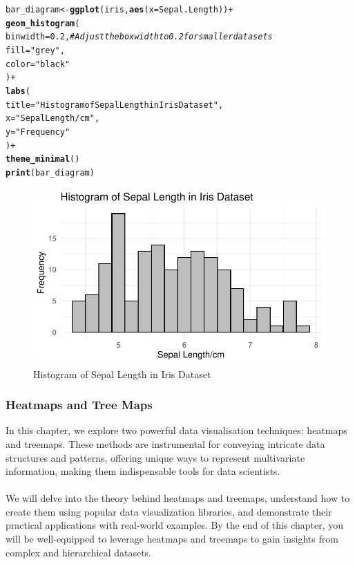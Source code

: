 \documentclass{article}\usepackage[]{graphicx}\usepackage[]{xcolor}
\makeatletter
\def\maxwidth{ %
  \ifdim\Gin@nat@width>\linewidth
    \linewidth
  \else
    \Gin@nat@width
  \fi
}
\newcommand{\hlnum}[1]{\textcolor[rgb]{0.686,0.059,0.569}{#1}}%
\newcommand{\hlstr}[1]{\textcolor[rgb]{0.192,0.494,0.8}{#1}}%
\newcommand{\hlcom}[1]{\textcolor[rgb]{0.678,0.584,0.686}{\textit{#1}}}%
\newcommand{\hlopt}[1]{\textcolor[rgb]{0,0,0}{#1}}%
\newcommand{\hlstd}[1]{\textcolor[rgb]{0.345,0.345,0.345}{#1}}%
\newcommand{\hlkwb}[1]{\textcolor[rgb]{0.69,0.353,0.396}{#1}}%
\newcommand{\hlkwc}[1]{\textcolor[rgb]{0.333,0.667,0.333}{#1}}%
\newcommand{\hlkwd}[1]{\textcolor[rgb]{0.737,0.353,0.396}{\textbf{#1}}}%
\newenvironment{kframe}{%
 \def\at@end@of@kframe{}%
 \ifinner\ifhmode%
  \def\at@end@of@kframe{\end{minipage}}%
  \begin{minipage}{\columnwidth}%
 \fi\fi%
 \def\FrameCommand##1{\hskip\@totalleftmargin \hskip-\fboxsep
 \colorbox{shadecolor}{##1}\hskip-\fboxsep
     \hskip-\linewidth \hskip-\@totalleftmargin \hskip\columnwidth}%
 \MakeFramed {\advance\hsize-\width
   \@totalleftmargin\z@ \linewidth\hsize
   \@setminipage}}%
 {\par\unskip\endMakeFramed%
 \at@end@of@kframe}
\newenvironment{knitrout}{}{} %
\makeatother
\begin{document}
\begin{knitrout}
\color{fgcolor}\begin{kframe}
\begin{alltt}
\hlstd{bar_diagram} \hlkwb{<-} \hlkwd{ggplot}\hlstd{(iris,} \hlkwd{aes}\hlstd{(}\hlkwc{x} \hlstd{= Sepal.Length))} \hlopt{+}
  \hlkwd{geom_histogram}\hlstd{(}
    \hlkwc{binwidth} \hlstd{=} \hlnum{0.2}\hlstd{,}  \hlcom{# Adjust the box width to 0.2 for smaller data sets}
    \hlkwc{fill} \hlstd{=} \hlstr{"grey"}\hlstd{,}
    \hlkwc{color} \hlstd{=} \hlstr{"black"}
  \hlstd{)} \hlopt{+}
  \hlkwd{labs}\hlstd{(}
    \hlkwc{title} \hlstd{=} \hlstr{"Histogram of Sepal Length in Iris Dataset"}\hlstd{,}
    \hlkwc{x} \hlstd{=} \hlstr{"Sepal Length/cm"}\hlstd{,}
    \hlkwc{y} \hlstd{=} \hlstr{"Frequency"}
  \hlstd{)} \hlopt{+}
  \hlkwd{theme_minimal}\hlstd{()}
\hlkwd{print}\hlstd{(bar_diagram)}
\end{alltt}
\end{kframe}\begin{figure}
\includegraphics[width=\maxwidth]{figure/hist3-1} \caption[Histogram of Sepal Length in Iris Dataset]{Histogram of Sepal Length in Iris Dataset}\label{fig:hist3}
\end{figure}

\end{knitrout}

\subsubsection{Heatmaps and Tree Maps}
In this chapter, we explore two powerful data visualisation techniques: heatmaps and treemaps. These methods are instrumental for conveying intricate data structures and patterns, offering unique ways to represent multivariate information, making them indispensable tools for data scientists.
\\  
\\We will delve into the theory behind heatmaps and treemaps, understand how to create them using popular data visualization libraries, and demonstrate their practical applications with real-world examples. By the end of this chapter, you will be well-equipped to leverage heatmaps and treemaps to gain insights from complex and hierarchical datasets.
\end{document}
